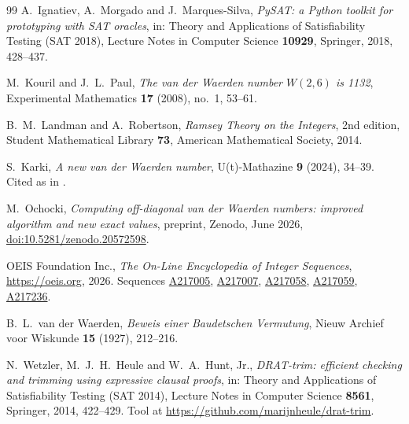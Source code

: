 \documentclass[12pt]{article}
\theoremstyle{remark}
\begin{document}
\begin{thebibliography}{99}
A.~Ignatiev, A.~Morgado and J.~Marques-Silva,
\emph{PySAT: a Python toolkit for prototyping with SAT oracles},
in: Theory and Applications of Satisfiability Testing (SAT 2018),
Lecture Notes in Computer Science \textbf{10929}, Springer, 2018, 428--437.

M.~Kouril and J.~L.~Paul,
\emph{The van der Waerden number $W(2,6)$ is 1132},
Experimental Mathematics \textbf{17} (2008), no.~1, 53--61.

B.~M.~Landman and A.~Robertson,
\emph{Ramsey Theory on the Integers}, 2nd edition,
Student Mathematical Library \textbf{73}, American Mathematical Society,
2014.

S.~Karki,
\emph{A new van der Waerden number},
U(t)-Mathazine \textbf{9} (2024), 34--39. Cited as in \cite{ochocki}.

M.~Ochocki,
\emph{Computing off-diagonal van der Waerden numbers: improved algorithm and
new exact values}, preprint, Zenodo, June 2026,
\href{https://doi.org/10.5281/zenodo.20572598}{doi:10.5281/zenodo.20572598}.

OEIS Foundation Inc.,
\emph{The On-Line Encyclopedia of Integer Sequences},
\url{https://oeis.org}, 2026. Sequences
\href{https://oeis.org/A217005}{A217005},
\href{https://oeis.org/A217007}{A217007},
\href{https://oeis.org/A217058}{A217058},
\href{https://oeis.org/A217059}{A217059},
\href{https://oeis.org/A217236}{A217236}.

B.~L.~van der Waerden,
\emph{Beweis einer Baudetschen Vermutung},
Nieuw Archief voor Wiskunde \textbf{15} (1927), 212--216.

N.~Wetzler, M.~J.~H.~Heule and W.~A.~Hunt, Jr.,
\emph{DRAT-trim: efficient checking and trimming using expressive clausal
proofs},
in: Theory and Applications of Satisfiability Testing (SAT 2014),
Lecture Notes in Computer Science \textbf{8561}, Springer, 2014, 422--429.
Tool at \url{https://github.com/marijnheule/drat-trim}.

\end{thebibliography}
\end{document}

